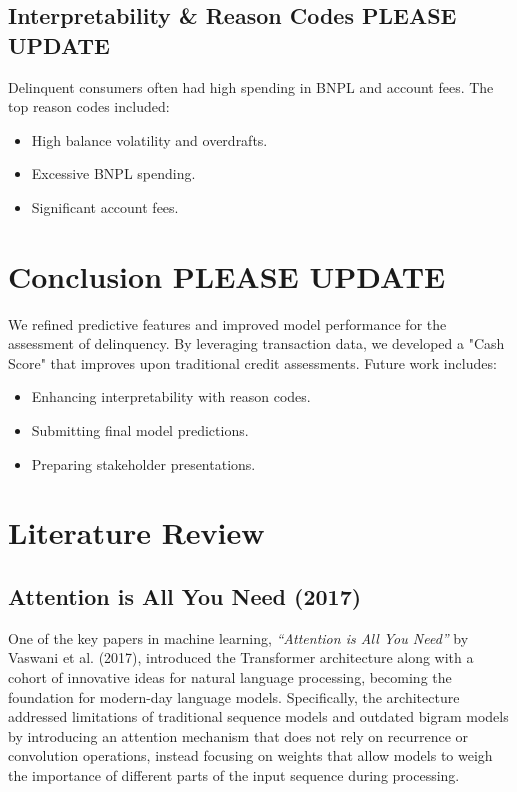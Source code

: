 \documentclass[12pt,letterpaper]{article}
\begin{document}
\subsection{Interpretability \& Reason Codes PLEASE UPDATE}
Delinquent consumers often had high spending in BNPL and account fees. The top reason codes included:
\begin{itemize}
    \item High balance volatility and overdrafts.
    \item Excessive BNPL spending.
    \item Significant account fees.
\end{itemize}

\section{Conclusion PLEASE UPDATE}
We refined predictive features and improved model performance for the assessment of delinquency. By leveraging transaction data, we developed a "Cash Score" that improves upon traditional credit assessments. Future work includes:
\begin{itemize}
    \item Enhancing interpretability with reason codes.
    \item Submitting final model predictions.
    \item Preparing stakeholder presentations.
\end{itemize}


\section{Literature Review}

\subsection{Attention is All You Need (2017)}

One of the key papers in machine learning, \textit{“Attention is All You Need”} by Vaswani et al. (2017), introduced the Transformer architecture along with a cohort of innovative ideas for natural language processing, becoming the foundation for modern-day language models. Specifically, the architecture addressed limitations of traditional sequence models and outdated bigram models by introducing an attention mechanism that does not rely on recurrence or convolution operations, instead focusing on weights that allow models to weigh the importance of different parts of the input sequence during processing.
\end{document}
